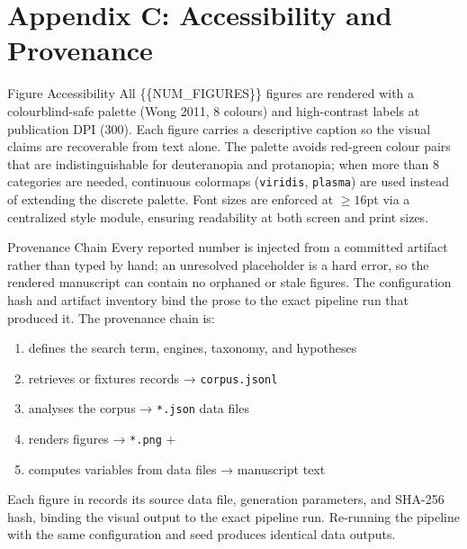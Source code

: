 \documentclass[
  ignorenonframetext,
]{beamer}
\author{}
\date{}
\providecommand{\tightlist}{%
  \setlength{\itemsep}{0pt}\setlength{\parskip}{0pt}}
\begin{document}
\section{Appendix C: Accessibility and
Provenance}\label{appendix-c-accessibility-and-provenance}

\begin{frame}{Figure Accessibility}
\label{figure-accessibility}
All \{\{NUM\_FIGURES\}\} figures are rendered with a colourblind-safe
palette (Wong 2011, 8 colours) and high-contrast labels at publication
DPI (300). Each figure carries a descriptive caption so the visual
claims are recoverable from text alone. The palette avoids red-green
colour pairs that are indistinguishable for deuteranopia and protanopia;
when more than 8 categories are needed, continuous colormaps
(\texttt{viridis}, \texttt{plasma}) are used instead of extending the
discrete palette. Font sizes are enforced at \(\geq 16\)pt via a
centralized style module, ensuring readability at both screen and print
sizes.
\end{frame}

\begin{frame}{Provenance Chain}
\label{provenance-chain}
Every reported number is injected from a committed artifact rather than
typed by hand; an unresolved placeholder is a hard error, so the
rendered manuscript can contain no orphaned or stale figures. The
configuration hash and artifact inventory bind the prose to the exact
pipeline run that produced it. The provenance chain is:

\begin{enumerate}
\tightlist
\item
   defines the search term, engines,
  taxonomy, and hypotheses
\item
   retrieves or fixtures
  records → \texttt{corpus.jsonl}
\item
   analyses the corpus →
  \texttt{*.json} data files
\item
   renders figures →
  \texttt{*.png} + 
\item
   computes variables from data
  files → manuscript text
\end{enumerate}

Each figure in  records its source data
file, generation parameters, and SHA-256 hash, binding the visual output
to the exact pipeline run. Re-running the pipeline with the same
configuration and seed produces identical data outputs.
\end{frame}
\end{document}
